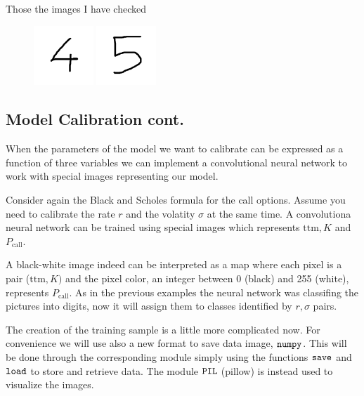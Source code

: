 Those the images I have checked

\begin{figure}[htb]
	\centering
	\includegraphics[width=0.2\textwidth]{figures/four.png}
	\includegraphics[width=0.2\textwidth]{figures/five.png}
\end{figure}

\subsection{Model Calibration cont.}\label{model-calibration-cont.}

When the parameters of the model we want to calibrate can be expressed
as a function of three variables we can implement a convolutional neural network to work with special images representing our model.

Consider again the Black and Scholes formula for the call options.
Assume you need to calibrate the rate \(r\) and the volatity \(\sigma\)
at the same time. A convolutiona neural network can be trained using
special images which represents \(\mathrm{ttm}, K\) and
\(P_\textrm{call}\).

A black-white image indeed can be interpreted as a map where each pixel
is a pair (\(\mathrm{ttm}, K)\) and the pixel color, an integer between
0 (black) and 255 (white), represents \(P_\textrm{call}\). As in the
previous examples the neural network was classifing the pictures into
digits, now it will assign them to classes identified by \(r, \sigma\)
pairs.

The creation of the training sample is a little more complicated now.
For convenience we will use also a new format to save data image,
\(\tt{numpy}\). This will be done through the corresponding module
simply using the functions \(\tt{save}\) and \(\tt{load}\) to store and
retrieve data. The module \(\tt{PIL}\) (pillow) is instead used to
visualize the images.

